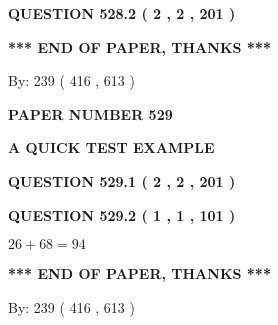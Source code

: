 \documentclass[12pt]{article}
\begin{document}
 
  
\vspace{0.2in}
  
{\textbf{\Large{QUESTION
528.2 
 ( 2 , 2 , 201 )
}}}
  
  
   
   
 \vspace{0.2in}
 
   
   
   
   
\vspace{1.0in} 
{\textbf{\large{ *** END OF PAPER, THANKS *** }}} 
   
   
\hspace{1.0in} By: 
 239 ( 416 ,  613 )
   
   
   
   
\newpage 
\setcounter{page}{ 
   529001 } 
   
   
   
   
 {\textbf{ \Large{ PAPER NUMBER  529  }}}
   
   
\vspace{0.2in}
   
   
   
   
   
   
 \vspace{0.2in}
{\LARGE {\textbf{ A QUICK TEST EXAMPLE}}}
   
   
  
\vspace{0.2in}
  
{\textbf{\Large{QUESTION
529.1 
 ( 2 , 2 , 201 )
}}}
  
  
  
\vspace{0.2in}
  
{\textbf{\Large{QUESTION
529.2 
 ( 1 , 1 , 101 )
}}}
  
  
 
 

$ %
26 +  %
68=   %
94$
 
 
   
   
 \vspace{0.2in}
 
   
   
   
   
\vspace{1.0in} 
{\textbf{\large{ *** END OF PAPER, THANKS *** }}} 
   
   
\hspace{1.0in} By: 
 239 ( 416 ,  613 )
   
\end{document}
